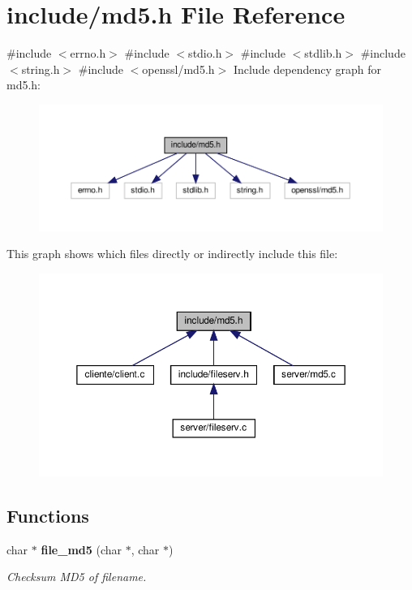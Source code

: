 \section{include/md5.h File Reference}
\label{md5_8h}
{\ttfamily \#include $<$errno.\+h$>$}\newline
{\ttfamily \#include $<$stdio.\+h$>$}\newline
{\ttfamily \#include $<$stdlib.\+h$>$}\newline
{\ttfamily \#include $<$string.\+h$>$}\newline
{\ttfamily \#include $<$openssl/md5.\+h$>$}\newline
Include dependency graph for md5.\+h\+:\nopagebreak
\begin{figure}[H]
\begin{center}
\leavevmode
\includegraphics[width=350pt]{md5_8h__incl}
\end{center}
\end{figure}
This graph shows which files directly or indirectly include this file\+:\nopagebreak
\begin{figure}[H]
\begin{center}
\leavevmode
\includegraphics[width=350pt]{md5_8h__dep__incl}
\end{center}
\end{figure}
\subsection*{Functions}
\begin{DoxyCompactItemize}
\item 
char $\ast$ \textbf{ file\+\_\+md5} (char $\ast$, char $\ast$)
\begin{DoxyCompactList}\small\item\em Checksum M\+D5 of filename. \end{DoxyCompactList}\end{DoxyCompactItemize}


